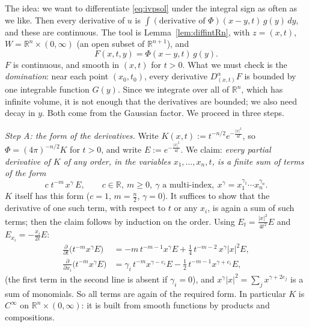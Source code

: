 \documentclass[11pt]{article}
\theoremstyle{plain}
\theoremstyle{definition}
\theoremstyle{remark}
\begin{document}
The idea: we want to differentiate \eqref{eq:ivpsol} under the integral sign as often as we like. Then every derivative of $u$ is $\int (\text{derivative of }\Phi)(x-y,t)\, g(y)\, dy$, and these are continuous. The tool is Lemma~\ref{lem:diffintRn}, with $z = (x,t)$, $W = \mathbb{R}^n \times (0,\infty)$ (an open subset of $\mathbb{R}^{n+1}$), and
$$ F(x,t,y) = \Phi(x - y,t)\, g(y). $$
$F$ is continuous, and smooth in $(x,t)$ for $t > 0$. What we must check is the \emph{domination}: near each point $(x_0,t_0)$, every derivative $D^\alpha_{(x,t)}F$ is bounded by one integrable function $G(y)$. Since we integrate over all of $\mathbb{R}^n$, which has infinite volume, it is not enough that the derivatives are bounded; we also need decay in $y$. Both come from the Gaussian factor. We proceed in three steps.

\emph{Step A: the form of the derivatives.} Write $K(x,t) := t^{-n/2}e^{-\frac{|x|^2}{4t}}$, so $\Phi = (4\pi)^{-n/2}K$ for $t > 0$, and write $E := e^{-\frac{|x|^2}{4t}}$. We claim: \emph{every partial derivative of $K$ of any order, in the variables $x_1,\dots,x_n,t$, is a finite sum of terms of the form}
$$ c\; t^{-m}\, x^\gamma\, E, \qquad c \in \mathbb{R},\ m \geq 0,\ \gamma \text{ a multi-index},\ x^\gamma = x_1^{\gamma_1}\cdots x_n^{\gamma_n}. $$
$K$ itself has this form ($c = 1$, $m = \frac n2$, $\gamma = 0$). It suffices to show that the derivative of one such term, with respect to $t$ or any $x_i$, is again a sum of such terms; then the claim follows by induction on the order. Using $E_t = \frac{|x|^2}{4t^2}E$ and $E_{x_i} = -\frac{x_i}{2t}E$:
\begin{align*}
\frac{\partial}{\partial t}\big(t^{-m}x^\gamma E\big) &= -m\,t^{-m-1}x^\gamma E + \frac14\, t^{-m-2}\, x^\gamma |x|^2 E, \\
\frac{\partial}{\partial x_i}\big(t^{-m}x^\gamma E\big) &= \gamma_i\, t^{-m}x^{\gamma - e_i}E - \frac12\, t^{-m-1}x^{\gamma+e_i}E,
\end{align*}
(the first term in the second line is absent if $\gamma_i = 0$), and $x^\gamma|x|^2 = \sum_j x^{\gamma + 2e_j}$ is a sum of monomials. So all terms are again of the required form. In particular $K$ is $C^\infty$ on $\mathbb{R}^n \times (0,\infty)$: it is built from smooth functions by products and compositions.
\end{document}
